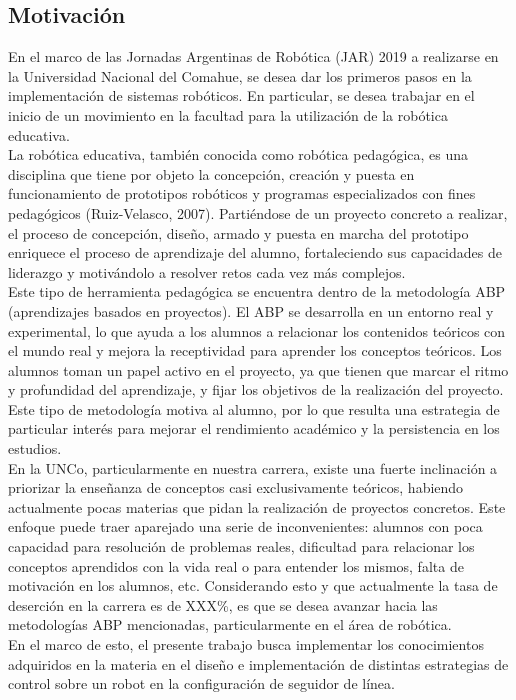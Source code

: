 \documentclass[10pt,conference,a4paper,onecolumn]{article}%
\begin{document}
\subsection{Motivación}
En el marco de las Jornadas Argentinas de Robótica (JAR) 2019 a realizarse en la Universidad Nacional del Comahue, se desea dar los primeros pasos en la implementación de sistemas robóticos. En particular, se desea trabajar en el inicio de un movimiento en la facultad para la utilización de la robótica educativa. \\
La robótica educativa, también conocida como robótica pedagógica, es una disciplina que tiene por objeto la concepción, creación y puesta en funcionamiento de prototipos robóticos y programas especializados con fines pedagógicos (Ruiz-Velasco, 2007). Partiéndose de un proyecto concreto a realizar, el proceso de concepción, diseño, armado y puesta en marcha del prototipo enriquece el proceso de aprendizaje del alumno, fortaleciendo sus capacidades de liderazgo y motivándolo a resolver retos cada vez más
complejos. \\
Este tipo de herramienta pedagógica se encuentra dentro de la metodología ABP (aprendizajes basados en proyectos). El ABP se desarrolla en un entorno real y experimental, lo que ayuda a los alumnos a relacionar los contenidos teóricos con el mundo real y mejora la receptividad para aprender los conceptos teóricos. Los alumnos toman un papel activo en el proyecto, ya que tienen que marcar el ritmo y profundidad del aprendizaje, y fijar los objetivos de la realización del proyecto. Este tipo de metodología motiva al alumno, por lo que resulta una estrategia de particular interés para mejorar el rendimiento académico y la persistencia
en los estudios. \\
En la UNCo, particularmente en nuestra carrera, existe una fuerte inclinación a priorizar la enseñanza de conceptos casi exclusivamente teóricos, habiendo actualmente pocas materias que pidan la realización de proyectos concretos. Este enfoque puede traer aparejado una serie de inconvenientes: alumnos con poca capacidad para resolución de problemas reales, dificultad para relacionar los conceptos aprendidos con la vida real o para entender los mismos, falta de motivación en los alumnos, etc. Considerando esto y que actualmente la tasa de deserción en la carrera es de XXX\%, es que se desea avanzar hacia las metodologías
ABP mencionadas, particularmente en el área de robótica. \\
En el marco de esto, el presente trabajo busca implementar los conocimientos adquiridos en la materia en el diseño e implementación de distintas estrategias de control sobre un robot en la configuración de seguidor de línea.
\end{document}
